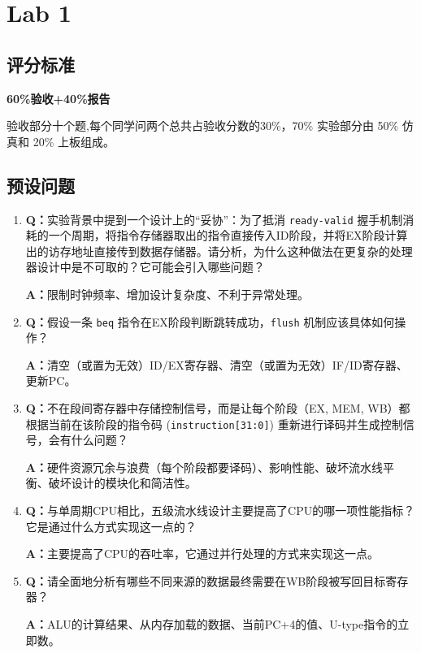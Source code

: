 \chapter{Lab 1}

\section{评分标准}
\textbf{60\%验收+40\%报告}

验收部分十个题,每个同学问两个总共占验收分数的30\%，70\% 实验部分由 50\% 仿真和 20\% 上板组成。

\section{预设问题}

\begin{enumerate}
    \item \textbf{Q：}实验背景中提到一个设计上的“妥协”：为了抵消 \texttt{ready-valid} 握手机制消耗的一个周期，将指令存储器取出的指令直接传入ID阶段，并将EX阶段计算出的访存地址直接传到数据存储器。请分析，为什么这种做法在更复杂的处理器设计中是不可取的？它可能会引入哪些问题？

\textbf{A：}限制时钟频率、增加设计复杂度、不利于异常处理。

\item \textbf{Q：}假设一条 \texttt{beq} 指令在EX阶段判断跳转成功，\texttt{flush} 机制应该具体如何操作？

\textbf{A：}清空（或置为无效）ID/EX寄存器、清空（或置为无效）IF/ID寄存器、更新PC。

\item \textbf{Q：}不在段间寄存器中存储控制信号，而是让每个阶段（EX, MEM, WB）都根据当前在该阶段的指令码 (\texttt{instruction[31:0]}) 重新进行译码并生成控制信号，会有什么问题？

\textbf{A：}硬件资源冗余与浪费（每个阶段都要译码）、影响性能、破坏流水线平衡、破坏设计的模块化和简洁性。

\item \textbf{Q：}与单周期CPU相比，五级流水线设计主要提高了CPU的哪一项性能指标？它是通过什么方式实现这一点的？

\textbf{A：}主要提高了CPU的吞吐率，它通过并行处理的方式来实现这一点。

\item \textbf{Q：}请全面地分析有哪些不同来源的数据最终需要在WB阶段被写回目标寄存器？

\textbf{A：}ALU的计算结果、从内存加载的数据、当前PC+4的值、U-type指令的立即数。


\end{enumerate}
